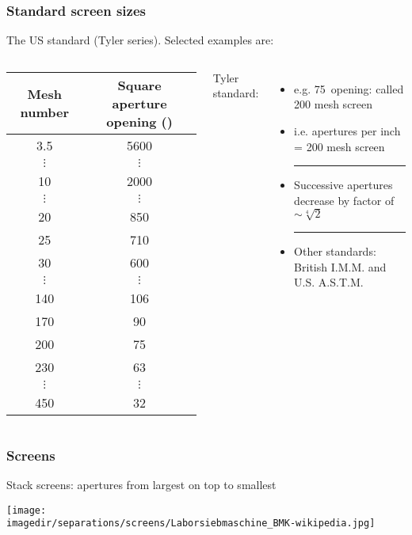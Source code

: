 \begin{frame}\frametitle{Standard screen sizes}
	The US standard (Tyler series). Selected examples are:	
	\vspace{8pt}
	\begin{columns}[c]
			\begin{tabular}{c|c}
				Mesh number & Square aperture opening (\micron) \\ \hline
				3.5		&	5600	\\
				$\vdots$& 	$\vdots$\\
				10		&	2000	\\
				$\vdots$& 	$\vdots$\\
				20		&	850		\\
				25		& 	710		\\
				30		& 	600		\\
				$\vdots$& 	$\vdots$\\
				140 	& 	106		\\
				170		& 	90		\\
				200		&	75		\\
				230 	&	63		\\ 
				$\vdots$& 	$\vdots$\\
				450 	& 	32
			\end{tabular}
			\small
			Tyler standard:
			\begin{itemize}				
				\item	e.g. 75\micron ~opening: called 200 mesh screen
				\item	i.e. apertures per inch = 200 mesh screen
				\vspace{12pt}
				\hrule
				\vspace{12pt}
				\item	Successive apertures decrease by factor of $\sim \sqrt[4]{2}$
				\vspace{12pt}
				\hrule
				\vspace{12pt}
				\item	Other standards: British I.M.M. and \\ U.S. A.S.T.M.				
			\end{itemize}
	\end{columns}	
\end{frame}

\begin{frame}\frametitle{Screens}
	Stack screens: apertures from largest on top to smallest
	\begin{center}
		\texttt{[image: \\imagedir/separations/screens/Laborsiebmaschine\_BMK-wikipedia.jpg]}
	\end{center}
\end{frame}

